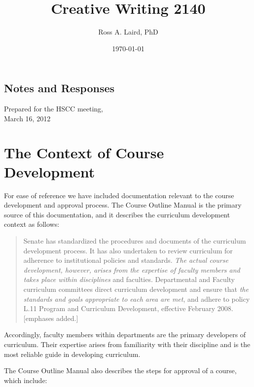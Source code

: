 \documentclass[letterpaper,10pt,headsepline]{scrreprt}
\author{Ross A. Laird, PhD}
\title{Creative Writing 2140}
\date{\today}
\begin{document}
\begin{titlingpage}
\begin{center}
\maketitle
\end{center}
\end{titlingpage}
\tableofcontents

\subsection{Notes and Responses}

Prepared for the HSCC meeting,\\
March 16, 2012

\section{The Context of Course Development}

For ease of reference we have included documentation relevant to the course development and approval process. The Course Outline Manual is the primary source of this documentation, and it describes the curriculum development context as follows:

\begin{quote}
Senate has standardized the procedures and documents of the curriculum development process. It has also undertaken to review curriculum for adherence to institutional policies and standards. \textit{The actual course development, however, arises from the expertise of faculty members and takes place within disciplines} and faculties. Departmental and Faculty curriculum committees direct curriculum development and ensure that \textit{the standards and goals appropriate to each area are met}, and adhere to policy L.11 Program and Curriculum Development, effective February 2008. [emphases added.]
\end{quote}

Accordingly, faculty members within departments are the primary developers of curriculum. Their expertise arises from familiarity with their discipline and is the most reliable guide in developing curriculum.

The Course Outline Manual also describes the steps for approval of a course, which include:
\end{document}
